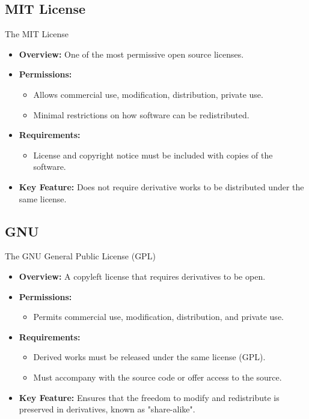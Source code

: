 \documentclass[10pt]{beamer}
\begin{document}
  \subsection{MIT License}
  \begin{frame}{The MIT License}
    \begin{itemize}
        \item \textbf{Overview:} One of the most permissive open source licenses.
        \item \textbf{Permissions:} 
            \begin{itemize}
                \item Allows commercial use, modification, distribution, private use.
                \item Minimal restrictions on how software can be redistributed.
            \end{itemize}
        \item \textbf{Requirements:}
            \begin{itemize}
                \item License and copyright notice must be included with copies of the software.
            \end{itemize}
        \item \textbf{Key Feature:} Does not require derivative works to be distributed under the same license.
    \end{itemize}
\end{frame}
\subsection{GNU}
\begin{frame}{The GNU General Public License (GPL)}
    \begin{itemize}
        \item \textbf{Overview:} A copyleft license that requires derivatives to be open.
        \item \textbf{Permissions:}
            \begin{itemize}
                \item Permits commercial use, modification, distribution, and private use.
            \end{itemize}
        \item \textbf{Requirements:}
            \begin{itemize}
                \item Derived works must be released under the same license (GPL).
                \item Must accompany with the source code or offer access to the source.
            \end{itemize}
        \item \textbf{Key Feature:} Ensures that the freedom to modify and redistribute is preserved in derivatives, known as "share-alike".
    \end{itemize}
\end{frame}
\end{document}
